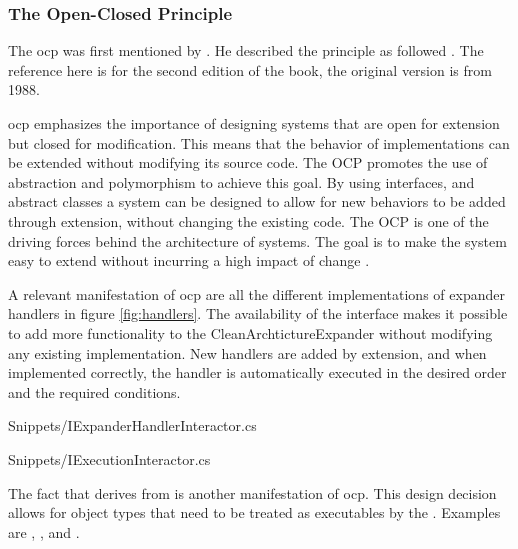 \subsubsection*{The Open-Closed Principle} \label{subsubsec:ocp}

The \gls{ocp} was first mentioned by . He described
the principle as followed \parencite[79]{meyer_object-oriented_1997}. The reference here
is for the second edition of the book, the original version is from 1988.


\gls{ocp} emphasizes the importance of designing systems that are open for extension but
closed for modification. This means that the behavior of implementations can be extended
without modifying its source code. The OCP promotes the use of abstraction and
polymorphism to achieve this goal. By using interfaces, and abstract classes a system can
be designed to allow for new behaviors to be added through extension, without changing the
existing code. The OCP is one of the driving forces	behind the architecture	of systems.
The goal is	to make	the	system easy	to extend without incurring a high impact of change
\parencite[94]{robert_c_martin_clean_2018}.

A relevant manifestation of \gls{ocp} are all the different implementations of expander
handlers in figure \ref{fig:handlers}. The availability of the
 interface makes it possible to add more
functionality to the CleanArchtictureExpander without modifying any existing
implementation. New handlers are added by extension, and when implemented correctly, the
handler is automatically executed in the desired order and the required conditions.


    {Snippets/IExpanderHandlerInteractor.cs}


    {Snippets/IExecutionInteractor.cs}

The fact that  derives from
 is another manifestation of \gls{ocp}. This
design decision allows for object types that need to be treated as executables by the
. Examples are
,
,
 and
. 

